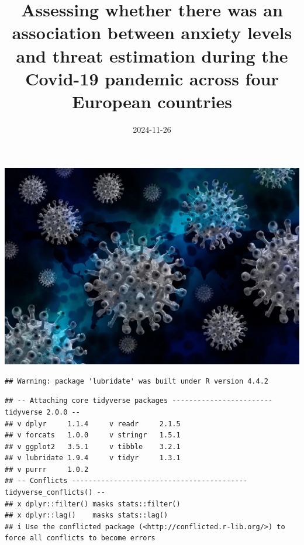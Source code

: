 \documentclass[
]{article}
\title{Assessing whether there was an association between anxiety levels
and threat estimation during the Covid-19 pandemic across four European
countries}
\author{}
\date{\vspace{-2.5em}2024-11-26}
\newenvironment{Shaded}{\begin{snugshade}}{\end{snugshade}}
\newcommand{\AttributeTok}[1]{\textcolor[rgb]{0.13,0.29,0.53}{#1}}
\newcommand{\ConstantTok}[1]{\textcolor[rgb]{0.56,0.35,0.01}{#1}}
\newcommand{\FunctionTok}[1]{\textcolor[rgb]{0.13,0.29,0.53}{\textbf{#1}}}
\newcommand{\NormalTok}[1]{#1}
\newcommand{\SpecialCharTok}[1]{\textcolor[rgb]{0.81,0.36,0.00}{\textbf{#1}}}
\begin{document}
\maketitle

{
\setcounter{tocdepth}{2}
\tableofcontents
}
\includegraphics{markdown_image/corona-5401250_1280.jpg}

\begin{Shaded}
\end{Shaded}

\begin{verbatim}
## Warning: package 'lubridate' was built under R version 4.4.2
\end{verbatim}

\begin{verbatim}
## -- Attaching core tidyverse packages ------------------------ tidyverse 2.0.0 --
## v dplyr     1.1.4     v readr     2.1.5
## v forcats   1.0.0     v stringr   1.5.1
## v ggplot2   3.5.1     v tibble    3.2.1
## v lubridate 1.9.4     v tidyr     1.3.1
## v purrr     1.0.2     
## -- Conflicts ------------------------------------------ tidyverse_conflicts() --
## x dplyr::filter() masks stats::filter()
## x dplyr::lag()    masks stats::lag()
## i Use the conflicted package (<http://conflicted.r-lib.org/>) to force all conflicts to become errors
\end{verbatim}
\end{document}
